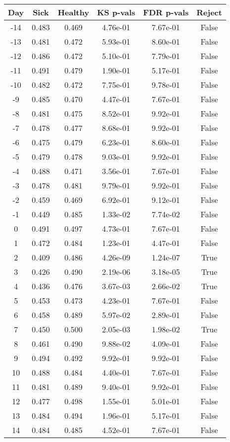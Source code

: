 \begin{tabular}{c|c|c|c|c|c}
Day &  Sick & Healthy &  KS p-vals & FDR p-vals & Reject\\
\hline
-14 & 0.483 &   0.469 &   4.76e-01 &   7.67e-01 &  False\\
-13 & 0.481 &   0.472 &   5.93e-01 &   8.60e-01 &  False\\
-12 & 0.486 &   0.472 &   5.10e-01 &   7.79e-01 &  False\\
-11 & 0.491 &   0.479 &   1.90e-01 &   5.17e-01 &  False\\
-10 & 0.482 &   0.472 &   7.75e-01 &   9.78e-01 &  False\\
 -9 & 0.485 &   0.470 &   4.47e-01 &   7.67e-01 &  False\\
 -8 & 0.481 &   0.475 &   8.52e-01 &   9.92e-01 &  False\\
 -7 & 0.478 &   0.477 &   8.68e-01 &   9.92e-01 &  False\\
 -6 & 0.475 &   0.479 &   6.23e-01 &   8.60e-01 &  False\\
 -5 & 0.479 &   0.478 &   9.03e-01 &   9.92e-01 &  False\\
 -4 & 0.488 &   0.471 &   3.56e-01 &   7.67e-01 &  False\\
 -3 & 0.478 &   0.481 &   9.79e-01 &   9.92e-01 &  False\\
 -2 & 0.459 &   0.469 &   6.92e-01 &   9.12e-01 &  False\\
 -1 & 0.449 &   0.485 &   1.33e-02 &   7.74e-02 &  False\\
  0 & 0.491 &   0.497 &   4.73e-01 &   7.67e-01 &  False\\
  1 & 0.472 &   0.484 &   1.23e-01 &   4.47e-01 &  False\\
  2 & 0.409 &   0.486 &   4.26e-09 &   1.24e-07 &   True\\
  3 & 0.426 &   0.490 &   2.19e-06 &   3.18e-05 &   True\\
  4 & 0.436 &   0.476 &   3.67e-03 &   2.66e-02 &   True\\
  5 & 0.453 &   0.473 &   4.23e-01 &   7.67e-01 &  False\\
  6 & 0.458 &   0.489 &   5.97e-02 &   2.89e-01 &  False\\
  7 & 0.450 &   0.500 &   2.05e-03 &   1.98e-02 &   True\\
  8 & 0.461 &   0.490 &   9.88e-02 &   4.09e-01 &  False\\
  9 & 0.494 &   0.492 &   9.92e-01 &   9.92e-01 &  False\\
 10 & 0.488 &   0.484 &   4.40e-01 &   7.67e-01 &  False\\
 11 & 0.481 &   0.489 &   9.40e-01 &   9.92e-01 &  False\\
 12 & 0.477 &   0.498 &   1.55e-01 &   5.01e-01 &  False\\
 13 & 0.484 &   0.494 &   1.96e-01 &   5.17e-01 &  False\\
 14 & 0.484 &   0.485 &   4.52e-01 &   7.67e-01 &  False\\
\end{tabular}